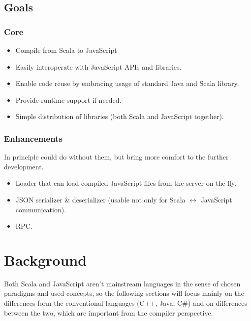\documentclass[12pt,a4paper]{report}
\begin{document}
\section{Goals}

\subsection{Core}

\begin{itemize}
\item Compile from Scala to JavaScript
\item Easily interoperate with JavaScript APIs and libraries.
\item Enable code reuse by embracing usage of standard Java and Scala library.
\item Provide runtime support if needed.
\item Simple distribution of libraries (both Scala and JavaScript together). 
\end{itemize}

\subsection{Enhancements}

In principle could do without them, but bring more comfort to the further development.

\begin{itemize}
\item Loader that can load compiled JavaScript files from the server on the fly.
\item JSON serializer \& deserializer (usable not only for Scala $\leftrightarrow$ JavaScript communication).
\item RPC.
\end{itemize}



\chapter{Background}

Both Scala and JavaScript aren't mainstream languages in the sense of chosen paradigms and used concepts, so the following sections will focus mainly on the differences form the conventional languages (C++, Java, C\#) and on differences between the two, which are important from the compiler perspective.
\end{document}
